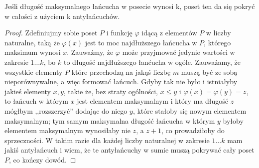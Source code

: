 \begin{theorem}
	Jeśli długość maksymalnego łańcucha w posecie wynosi k, poset ten da się pokryć w całości z użyciem k antyłańcuchów.
\end{theorem}

\begin{proof}
	Zdefiniujmy sobie poset $P$ i funkcję $\varphi$ idącą z elementów $P$ w liczby naturalne, taką że $\varphi(x)$ jest to moc najdłuższego łańcucha w $P$, którego maksimum wynosi $x$. Zauważmy, że $\varphi$ może przyjmować jedynie wartości w zakresie $1 \dots k$, bo $k$ to długość najdłuższego łanćucha w ogóle. Zauważamy, że wszystkie elementy $P$ które przechodzą na jakąś liczbę $m$ muszą być ze sobą nieporównywalne, a więc formować łańcuch. Gdyby tak nie było i istniałyby jakieś elementy $x, y$, takie że, bez straty ogólności, $x \leq y$ i $\varphi(x) = \varphi(y) = z$, to łańcuch w którym $x$ jest elementem maksymalnym i który ma długość $z$ mógłbym ,,rozszerzyć'' dodając do niego $y$, które stałoby się nowym elementem maksymalnym; tym samym maksymalna długość łańcucha w którym $y$ byłoby elementem maksymalnym wynosiłaby nie $z$, a $z+1$, co prowadziłoby do sprzeczności. W takim razie dla każdej liczby naturalnej w zakresie $1 \dots k$ mam jakiś antyłańcuch i wiem, że te antyłańcuchy w sumie muszą pokrywać cały poset $P$, co kończy dowód.
\end{proof}